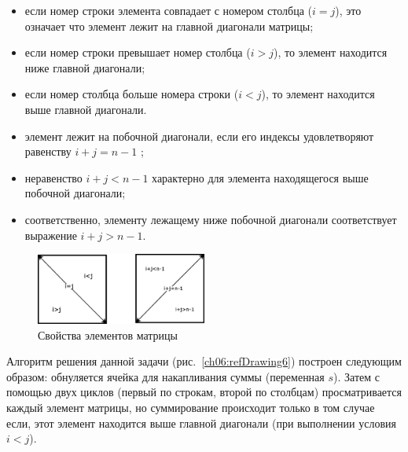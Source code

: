\begin{itemize}
\item если номер строки элемента совпадает с номером столбца ($i=j$), это означает что элемент лежит на главной
диагонали матрицы; 
\item если номер строки превышает номер столбца ($i>j$), то элемент находится ниже главной диагонали;
\item если номер столбца больше номера строки ($i<j$), то элемент находится выше главной диагонали.
\item элемент лежит на побочной диагонали, если его индексы удовлетворяют равенству  $i+j=n-1$ ; 
\item неравенство  $i+j<n-1$  характерно для элемента находящегося выше побочной диагонали;
\item соответственно, элементу лежащему ниже побочной диагонали соответствует выражение  $i+j>n-1$.
\end{itemize}


\begin{figure}[htb]
\begin{center}
\includegraphics[width=0.5\textwidth]{img/ris_6_6}
\caption{Свойства элементов матрицы}
\label{ch06:refDrawing5}
\end{center}
\end{figure}


Алгоритм решения данной задачи (рис.~\ref{ch06:refDrawing6}) построен следующим образом: обнуляется ячейка для
накапливания суммы (переменная $s$). Затем с помощью двух циклов (первый по строкам, второй по столбцам) просматривается
каждый элемент матрицы, но суммирование происходит только в том случае если, этот элемент находится выше главной
диагонали (при выполнении условия  $i<j$).


